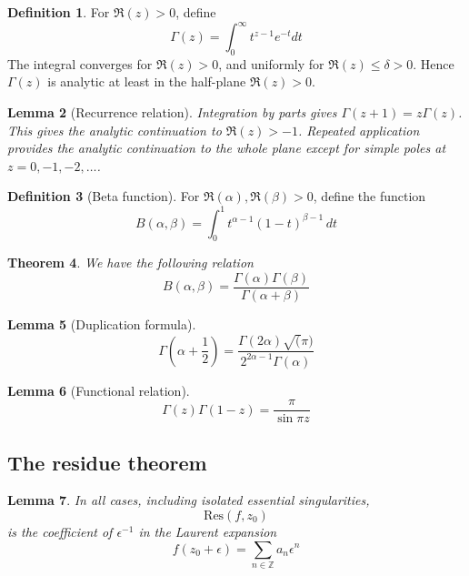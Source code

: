 \documentclass[10pt, oneside, reqno]{amsart}
\theoremstyle{plain}%
\newtheorem{thm}{Theorem}[section]
\newtheorem{lem}[thm]{Lemma}
\theoremstyle{definition}
\newtheorem{defn}[thm]{Definition}
\theoremstyle{remark}
\newcommand{\res}[2]{\text{Res}(#1,#2)}
\newcommand{\Z}{\mathbb{Z}}
\begin{document}
\begin{defn}
    For $\Re(z)> 0$, define \[
        \Gamma(z) = \int_0^\infty t^{z-1}e^{-t} dt
    \]
    The integral converges for $\Re(z)> 0$, and uniformly for $\Re(z) \leq \delta > 0$.  Hence $\Gamma(z)$ is analytic at least in the half-plane $\Re(z) > 0$.  
\end{defn}

\begin{lem}[Recurrence relation]
    Integration by parts gives $\Gamma(z+1) = z \Gamma(z)$. This gives the analytic continuation to $\Re(z) > -1$.  Repeated application provides the analytic continuation to the whole plane except for simple poles at $z = 0, -1, -2, \dots$.
\end{lem}


\begin{defn}[Beta function]
    For $\Re(\alpha), \Re(\beta) > 0$, define the function \[
        B(\alpha, \beta) = \int_0^1 t^{\alpha - 1} (1-t)^{\beta - 1} \, dt
    \]
\end{defn}

\begin{thm}
We have the following relation
\[ B(\alpha, \beta) = \frac{\Gamma(\alpha) \Gamma(\beta)}{\Gamma(\alpha + \beta)}
\]
\end{thm}

\begin{lem}[Duplication formula]
    \[
        \Gamma(\alpha + \frac{1}{2}) = \frac{\Gamma(2\alpha) \sqrt(\pi)}{2^{2\alpha - 1} \Gamma(\alpha)}
    \]
\end{lem}

\begin{lem}[Functional relation]
    \[
        \Gamma(z) \Gamma(1-z) = \frac{\pi}{\sin \pi z}
    \]
\end{lem}




\subsection{The residue theorem} %
\label{sec:the_residue_theorem}


\begin{lem}
    In all cases, including isolated essential singularities, \[
        \res{f}{z_0}
    \] is the coefficient of $\epsilon^{-1}$ in the Laurent expansion \[
        f(z_0 + \epsilon) = \sum_{n \in \Z} a_n \epsilon^n
    \]
\end{lem}
\end{document}
